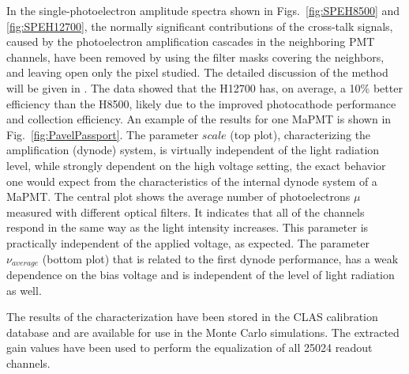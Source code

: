 \documentclass[5p,times,twocolumn]{elsarticle}
\begin{document}
In the single-photoelectron amplitude spectra shown in Figs.~\ref{fig:SPEH8500} and \ref{fig:SPEH12700}, the normally significant contributions of the cross-talk signals, caused by the photoelectron amplification cascades in the neighboring PMT channels, have been removed by using the filter masks covering the neighbors, and leaving open only the pixel studied. The detailed discussion of the method will be given in \cite{TBP}.
The data showed that the H12700 has, on average, a 10\% better efficiency than the H8500, likely due to the improved
photocathode performance and collection efficiency. An example of the results for one MaPMT is shown in
Fig.~\ref{fig:PavelPassport}. 
The parameter $scale$ (top plot), characterizing the amplification (dynode) system, is
virtually independent of the light radiation level, while strongly dependent on the high voltage setting, the exact behavior one would expect from the characteristics of the internal dynode system of a MaPMT. 
The central plot shows the average number of photoelectrons $\mu$ measured with different optical filters. 
It indicates that all of the channels respond in the same way as the light intensity increases. This parameter is practically independent of the applied voltage, as expected.
The parameter $\nu_{average}$ (bottom plot) that is related to the first dynode performance, has a weak dependence on the bias voltage  and is independent of the level of light radiation as well. 

The results of the characterization have been stored in the CLAS calibration database and are available for use in
the Monte Carlo simulations. The extracted gain values have been used to perform the equalization of all 25024
readout channels.

\end{document}
